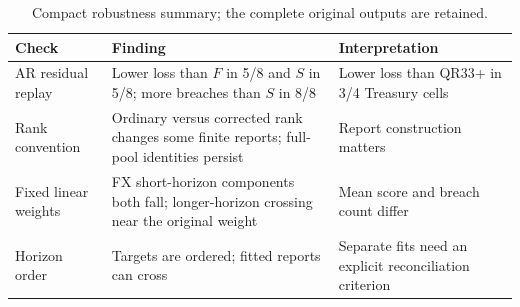 \begin{table}[!htbp]
\centering\footnotesize
\caption{Compact robustness summary; the complete original outputs are retained.}\label{tab:robustness}
\begin{tabular}{>{\raggedright\arraybackslash}p{.19\linewidth}>{\raggedright\arraybackslash}p{.47\linewidth}>{\raggedright\arraybackslash}p{.23\linewidth}}
\toprule
Check & Finding & Interpretation \\
\midrule
AR residual replay & Lower loss than $F$ in 5/8 and $S$ in 5/8; more breaches than $S$ in 8/8 & Lower loss than QR33+ in 3/4 Treasury cells \\
Rank convention & Ordinary versus corrected rank changes some finite reports; full-pool identities persist & Report construction matters \\
Fixed linear weights & FX short-horizon components both fall; longer-horizon crossing near the original weight & Mean score and breach count differ \\
Horizon order & Targets are ordered; fitted reports can cross & Separate fits need an explicit reconciliation criterion \\
\bottomrule
\end{tabular}
\end{table}

